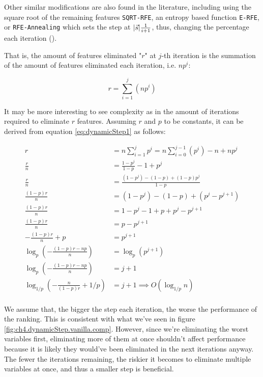 Other similar modifications are also found in the literature, including using the square root of the remaining features \texttt{SQRT-RFE}, an entropy based function \texttt{E-RFE}, or \texttt{RFE-Annealing} which sets the step at $|\vec{s}| \frac{1}{i+1}$, thus, changing the percentage each iteration (\cite{ding_improving_2006}).

That is, the amount of features eliminated "$r$" at $j$-th iteration is the summation of the amount of features eliminated each iteration, i.e. $np^i$:

\begin{equation}\label{eq:dynamicStep1}
    r = \sum_{i = 1}^{j}{(np^i)} 
\end{equation}

It may be more interesting to see complexity as in the amount of iterations re\-quired to eliminate $r$ features. Assuming $r$ and $p$ to be constants, it can be derived from equation \ref{eq:dynamicStep1} as follows:

\begin{align*}
    r &= n \sum_{i = 1}^{j}{p^i} = n \sum_{i = 0}^{j-1}{(p^i)} - n + np^j \\
    \frac{r}{n} &= \frac{1-p^j}{1-p} - 1 + p^j \\
    \frac{r}{n} &= \frac{(1-p^j) - (1-p) + (1-p)p^j}{1-p}\\
    \frac{(1-p)r}{n} &= (1-p^j) - (1-p) + (p^j-p^{j+1})\\
    \frac{(1-p)r}{n} &= 1 -p^j -1 + p + p^j - p^{j+1}\\
    \frac{(1-p)r}{n} &= p - p^{j+1}\\
    - \frac{(1-p)r}{n} + p &= p^{j+1}\\
    \log_{p} \left( - \frac{(1-p)r - np}{n} \right) &= \log_{p} (p^{j+1})\\
    \log_{p} \left( - \frac{(1-p)r - np}{n} \right) &= j + 1\\
    \log_{1/p} \left( - \frac{n}{(1-p)r} + 1/p \right) &= j + 1 \implies O(\log_{1/p} n)
\end{align*}\\

We assume that, the bigger the step each iteration, the worse the performance of the ranking. This is consistent with what we've seen in figure \ref{fig:ch4.dynamicStep.vanilla.comp}. However, since we're eliminating the worst variables first, eliminating more of them at once shouldn't affect performance because it is likely they would've been eliminated in the next iterations anyway. The fewer the iterations remaining, the riskier it becomes to eliminate multiple variables at once, and thus a smaller step is beneficial.

